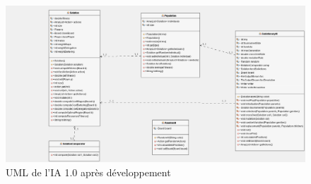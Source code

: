 \begin{figure}[h]
	\centering
	\includegraphics[width=1\linewidth]{images/UML_Himalaya_IA_1}
	\caption{UML de l'IA 1.0 après développement}
	\label{fig:UML_IA}
\end{figure}
